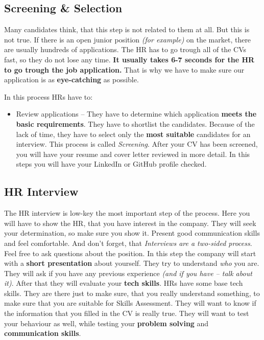 \subsection{Screening \& Selection}
Many candidates think, that this step is not related to them at all. But this is not true. If there is an open junior position \textit{(for example)} on the market, there are usually hundreds of applications. The HR has to go trough all of the CVs fast, so they do not lose any time. \textbf{It usually takes 6-7 seconds for the HR to go trough the job application.} That is why we have to make sure our application is as \textbf{eye-catching} as possible.

In this process HRs have to:
\begin{itemize}
    \item Review applications -- They have to determine which application \textbf{meets the basic requirements}. They have to shortlist the candidates. Because of the lack of time, they have to select only the \textbf{most suitable} candidates for an interview. This process is called \textit{Screening}. After your CV has been screened, you will have your resume and cover letter reviewed in more detail. In this steps you will have your LinkedIn or GitHub profile checked. 
\end{itemize}

\subsection{HR Interview}
The HR interview is low-key the most important step of the process. Here you will have to show the HR, that you have interest in the company. They will seek your determination, so make sure you show it. Present good communication skills and feel comfortable. And don't forget, that \textit{Interviews are a two-sided process}. Feel free to ask questions about the position.
In this step the company will start with a \textbf{short presentation} about yourself. They try to understand \textit{who} you are. They will ask if you have any previous experience \textit{(and if you have -- talk about it)}. After that they will evaluate your \textbf{tech skills}. HRs have some base tech skills. They are there just to make sure, that you really understand something, to make sure that you are suitable for Skills Assessment. They will want to know if the information that you filled in the CV is really true. They will want to test your behaviour as well, while testing your \textbf{problem solving} and \textbf{communication skills}.

